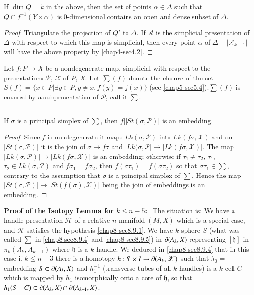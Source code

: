 \begin{lemma}\label{chap8-lem8.11.2}
If $\dim Q=k$ in the above, then the set of points $\alpha\in\Delta$ such that $Q\cap f^{-1}(Y\times \alpha)$ is $0$-dimensional contains an open and dense subset of $\Delta$.
\end{lemma}

\begin{proof}
Triangulate the projection of $Q'$ to $\Delta$. If $\mathscr{A}$ is the simplicial presentation of $\Delta$ with respect to which this map is simplicial, then every point $\alpha$ of $\Delta-|\mathscr{A}_{k-1}|$ will have the above property by \ref{chap4-sec4.2}.
\end{proof}

Let $f:P\to X$ be a nondegenerate map, simplicial with respect to the presentations $\mathscr{P}$, $\mathscr{X}$ of $P$, $X$. Let $\sum(f)$ denote the closure of the set $S(f)=\{x\in P|\exists y\in P, y\neq x,f(y)=f(x)\}$ (see \ref{chap5-sec5.4}).\pageoriginale $\sum(f)$ is covered by a subpresentation of $\mathscr{P}$, call it $\sum$. 

\setcounter{subsection}{2}
\subsection{}\label{chap8-sec8.11.3}
If $\sigma$ is a principal simplex of $\sum$, then $f||St(\sigma,\mathscr{P})|$ is an embedding.

\begin{proof}
Since $f$ is nondegenerate it maps $Lk(\sigma,\mathscr{P})$ into $Lk(f\sigma,\mathscr{X})$ and on $|St(\sigma,\mathscr{P})|$ it is the join of $\overline{\sigma}\to \overline{f\sigma}$ and $|Lk(\sigma,\mathscr{P}|\to |Lk(f\sigma,\mathscr{X})|$. The map $|Lk(\sigma,\mathscr{P})|\to |Lk(f\sigma,\mathscr{X})|$ is an embedding; otherwise if $\tau_{1}\neq \tau_{2}$, $\tau_{1}$, $\tau_{2}\in Lk(\sigma,\mathscr{P})$ and $f\sigma_{1}=f\sigma_{2}$, then $f(\sigma\tau_{1})=f(\sigma\tau_{2})$ so that $\sigma\tau_{1}\in\sum$, contrary to the assumption that $\sigma$ is a principal simplex of $\sum$. Hence the map $|St(\sigma,\mathscr{P})|\to |St(f(\sigma),\mathscr{X})|$ being the join of embeddings is an embedding.
\end{proof}

\noindent
{\bf Proof of the Isotopy Lemma for $k\leq n-5$:}~ The situation is: We have a handle presentation $\mathscr{H}$ of a relative $n$-manifold $(M,X)$ which is a special case, and $\mathscr{H}$ satisfies the hypothesis \ref{chap8-sec8.9.1}. We have $k$-sphere $S$ (what was called $\sum$ in \ref{chap8-sec8.9.4} and \ref{chap8-sec8.9.5}) in $\partial(A_{k},X)$ representing $[\mathfrak{h}]$ in $\pi_{k}(A_{k},A_{k-1})$ where $\mathfrak{h}$ is a $k$-handle. We deduced in \ref{chap8-sec8.9.4} that in this case if $k\leq n-3$ there is a homotopy $h:S\times I\to \partial(A_{k},\mathscr{X})$ such that $h_{0}=$ embedding $S\subset \partial (A_{k},X)$ and $h^{-1}_{1}$ (transverse tubes of all $k$-handles) is a $k$-cell $C$ which is mapped by $h_{1}$ isomorphically onto a core of $\mathfrak{h}$, so that $h_{1}(S-C)\subset \partial(A_{k},X)\cap \partial(A_{k-1},X)$.

